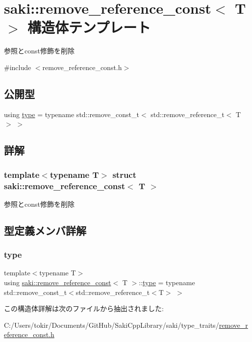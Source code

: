 \hypertarget{structsaki_1_1remove__reference__const}{}\section{saki\+:\+:remove\+\_\+reference\+\_\+const$<$ T $>$ 構造体テンプレート}
\label{structsaki_1_1remove__reference__const}


参照とconst修飾を削除  




{\ttfamily \#include $<$remove\+\_\+reference\+\_\+const.\+h$>$}

\subsection*{公開型}
\begin{DoxyCompactItemize}
\item 
using \mbox{\hyperlink{structsaki_1_1remove__reference__const_ac1734aa19be1e083bd9bd22c05f930e3}{type}} = typename std\+::remove\+\_\+const\+\_\+t$<$ std\+::remove\+\_\+reference\+\_\+t$<$ T $>$ $>$
\end{DoxyCompactItemize}


\subsection{詳解}
\subsubsection*{template$<$typename T$>$\newline
struct saki\+::remove\+\_\+reference\+\_\+const$<$ T $>$}

参照とconst修飾を削除 

\subsection{型定義メンバ詳解}
\mbox{\label{structsaki_1_1remove__reference__const_ac1734aa19be1e083bd9bd22c05f930e3}} 
\subsubsection{\texorpdfstring{type}{type}}
{\footnotesize\ttfamily template$<$typename T$>$ \\
using \mbox{\hyperlink{structsaki_1_1remove__reference__const}{saki\+::remove\+\_\+reference\+\_\+const}}$<$ T $>$\+::\mbox{\hyperlink{structsaki_1_1remove__reference__const_ac1734aa19be1e083bd9bd22c05f930e3}{type}} =  typename std\+::remove\+\_\+const\+\_\+t$<$std\+::remove\+\_\+reference\+\_\+t$<$T$>$ $>$}



この構造体詳解は次のファイルから抽出されました\+:\begin{DoxyCompactItemize}
\item 
C\+:/\+Users/tokir/\+Documents/\+Git\+Hub/\+Saki\+Cpp\+Library/saki/type\+\_\+traits/\mbox{\hyperlink{remove__reference__const_8h}{remove\+\_\+reference\+\_\+const.\+h}}\end{DoxyCompactItemize}
